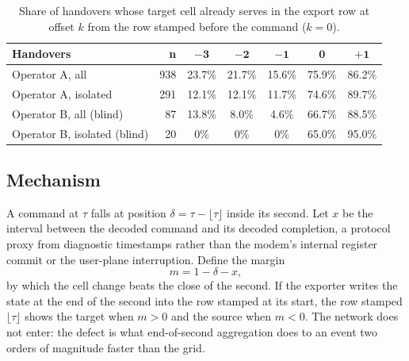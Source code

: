 \documentclass[5p,times,twocolumn]{elsarticle}
\begin{document}
\begin{table}[t]
\centering
\caption{Share of handovers whose target cell already serves in the export row at offset $k$ from the row stamped before the command ($k=0$).}
\label{tab:align}
\footnotesize
\setlength{\tabcolsep}{3pt}
\begin{tabularx}{\linewidth}{X r c c c c c}
\toprule
\textbf{Handovers} & \textbf{n} & $\mathbf{-3}$ & $\mathbf{-2}$ & $\mathbf{-1}$ & $\mathbf{0}$ & $\mathbf{+1}$ \\
\midrule
Operator A, all & 938 & 23.7\% & 21.7\% & 15.6\% & 75.9\% & 86.2\% \\
Operator A, isolated & 291 & 12.1\% & 12.1\% & 11.7\% & 74.6\% & 89.7\% \\
Operator B, all (blind) & 87 & 13.8\% & 8.0\% & 4.6\% & 66.7\% & 88.5\% \\
Operator B, isolated (blind) & 20 & 0\% & 0\% & 0\% & 65.0\% & 95.0\% \\
\bottomrule
\end{tabularx}
\end{table}

\subsection{Mechanism}
A command at $\tau$ falls at position $\delta = \tau - \lfloor\tau\rfloor$ inside its second. Let $x$ be the interval between the decoded command and its decoded completion, a protocol proxy from diagnostic timestamps rather than the modem's internal register commit or the user-plane interruption. Define the margin
\begin{equation}
m = 1 - \delta - x,
\label{eq:margin}
\end{equation}
by which the cell change beats the close of the second. If the exporter writes the state at the end of the second into the row stamped at its start, the row stamped $\lfloor\tau\rfloor$ shows the target when $m>0$ and the source when $m<0$. The network does not enter: the defect is what end-of-second aggregation does to an event two orders of magnitude faster than the grid.
\end{document}
